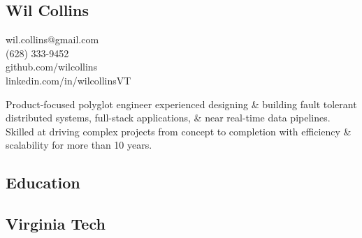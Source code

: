 \documentclass[]{resume}
\begin{document}
\nopagecolor{}

%
%
\lastupdated

%
%
%


%
%

\begin{minipage}[t]{0.35\textwidth} 
  \begin{blackhighlight}

    \section{Wil Collins}
    wil.collins@gmail.com \\
    (628) 333-9452  \\
    github.com/wilcollins \\
    linkedin.com/in/wilcollinsVT 
  \end{blackhighlight}
  \sectionsep



\begin{grayhighlight}
Product-focused polyglot engineer experienced designing \& building fault tolerant distributed systems, full-stack applications, \& near real-time data pipelines. Skilled at driving complex projects from concept to completion with efficiency \& scalability for more than 10 years.
\end{grayhighlight}

\sectionsep

\begin{grayhighlight}
\section{Education} 

\subsection{Virginia Tech}


\end{grayhighlight}
\end{minipage}
\end{document}
